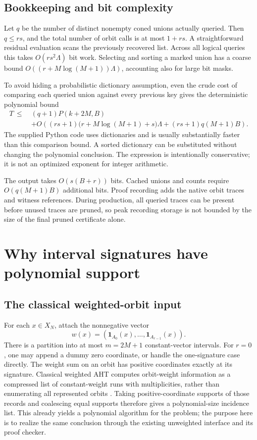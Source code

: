 \documentclass[11pt,letterpaper]{article}
\theoremstyle{definition}
\begin{document}
\subsection{Bookkeeping and bit complexity}\label{sec:bitcost}
Let $q$ be the number of distinct nonempty coned unions actually queried.
Then $q\le rs$, and the total number of orbit calls is at most $1+rs$.
A straightforward residual evaluation scans the previously recovered list.
Across all logical queries this takes $O(rs^2\Lambda)$ bit work. Selecting
and sorting a marked union has a coarse bound
$O((r+M\log(M+1))\Lambda)$, accounting also for large bit masks.

To avoid hiding a probabilistic dictionary assumption, even the crude cost
of comparing each queried union against every previous key gives the deterministic
polynomial bound
\begin{align}\label{eq:time}
 T\ \le\ &(q+1)P(k+2M,B)\nonumber\\
 &+O\!\left((rs+1)
   \bigl(r+M\log(M+1)+s\bigr)\Lambda
       +(rs+1)q(M+1)B\right).
\end{align}
The supplied Python code uses dictionaries and is usually substantially
faster than this comparison bound. A sorted dictionary can be substituted
without changing the polynomial conclusion. The expression is intentionally
conservative; it is not an optimized exponent for integer arithmetic.

The output takes $O(s(B+r))$ bits. Cached unions and counts require
$O(q(M+1)B)$ additional bits. Proof recording adds the native orbit traces
and witness references. During production, all queried traces can be
present before unused traces are pruned, so peak recording storage is not
bounded by the size of the final pruned certificate alone.

\section{Why interval signatures have polynomial support}\label{sec:support}

\subsection{The classical weighted-orbit input}
For each $x\in X_N$, attach the nonnegative vector
\[
 w(x)=(\mathbf1_{A_0}(x),\ldots,\mathbf1_{A_{r-1}}(x)).
\]
There is a partition into at most $m=2M+1$ constant-vector intervals.
For $r=0$, one may append a dummy zero coordinate, or handle the
one-signature case directly. The
weight sum on an orbit has positive coordinates exactly at its signature.
Classical weighted AHT computes orbit-weight information as a compressed
list of constant-weight runs with multiplicities, rather than enumerating
all represented orbits \cite[Section~6]{aht}. Taking positive-coordinate
supports of those records and coalescing equal supports therefore gives a
polynomial-size incidence list. This already yields a polynomial algorithm
for the problem; the purpose here is to realize the same conclusion through
the existing unweighted interface and its proof checker.
\end{document}
